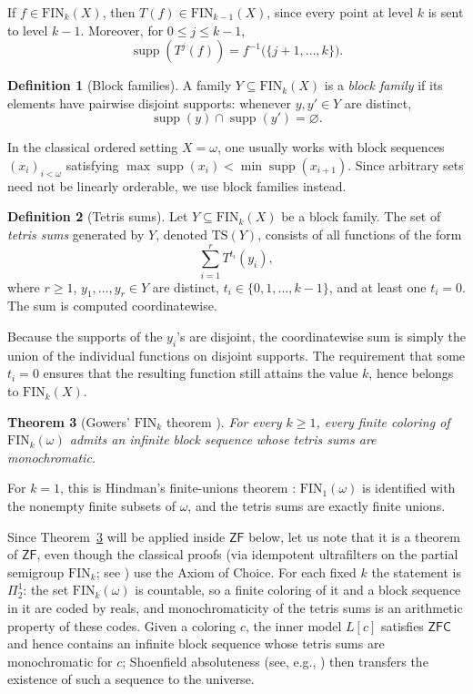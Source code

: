 \documentclass[11pt]{amsart}
\newtheorem{theorem}{Theorem}[section]
\theoremstyle{definition}
\newtheorem{definition}[theorem]{Definition}
\DeclareMathOperator{\supp}{supp}
\newcommand{\ZF}{\mathsf{ZF}}
\newcommand{\ZFC}{\mathsf{ZFC}}
\newcommand{\FIN}{\mathrm{FIN}}
\newcommand{\TS}{\mathrm{TS}}
\begin{document}
If \(f\in\FIN_k(X)\), then \(T(f)\in\FIN_{k-1}(X)\), since every point at level \(k\) is sent to level \(k-1\).  Moreover, for \(0\leq j\leq k-1\),
\[
    \supp(T^j(f))=f^{-1}\bigl(\{j+1,\dots,k\}\bigr).
\]

\begin{definition}[Block families]
A family \(Y\subseteq \FIN_k(X)\) is a \emph{block family} if its elements have pairwise disjoint supports: whenever \(y,y'\in Y\) are distinct,
\[
    \supp(y)\cap \supp(y')=\varnothing.
\]
\end{definition}

In the classical ordered setting \(X=\omega\), one usually works with block sequences \((x_i)_{i<\omega}\) satisfying \(\max\supp(x_i)<\min\supp(x_{i+1})\).  Since arbitrary sets need not be linearly orderable, we use block families instead.

\begin{definition}[Tetris sums]
Let \(Y\subseteq \FIN_k(X)\) be a block family.  The set of \emph{tetris sums} generated by \(Y\), denoted \(\TS(Y)\), consists of all functions of the form
\[
    \sum_{i=1}^r T^{t_i}(y_i),
\]
where \(r\geq 1\), \(y_1,
\dots,y_r\in Y\) are distinct, \(t_i\in\{0,1,\dots,k-1\}\), and at least one \(t_i=0\).  The sum is computed coordinatewise.
\end{definition}

Because the supports of the \(y_i\)'s are disjoint, the coordinatewise sum is simply the union of the individual functions on disjoint supports.  The requirement that some \(t_i=0\) ensures that the resulting function still attains the value \(k\), hence belongs to \(\FIN_k(X)\).

\begin{theorem}[Gowers' \(\FIN_k\) theorem \cite{Gowers}]\label{thm:gowers}
For every \(k\geq 1\), every finite coloring of \(\FIN_k(\omega)\) admits an infinite block sequence whose tetris sums are monochromatic.
\end{theorem}

For \(k=1\), this is Hindman's finite-unions theorem \cite{Hindman}: \(\FIN_1(\omega)\) is identified with the nonempty finite subsets of \(\omega\), and the tetris sums are exactly finite unions.

Since Theorem~\ref{thm:gowers} will be applied inside \(\ZF\) below, let us note that it is a theorem of \(\ZF\), even though the classical proofs (via idempotent ultrafilters on the partial semigroup \(\FIN_k\); see \cite{Todorcevic}) use the Axiom of Choice.  For each fixed \(k\) the statement is \(\Pi^1_2\): the set \(\FIN_k(\omega)\) is countable, so a finite coloring of it and a block sequence in it are coded by reals, and monochromaticity of the tetris sums is an arithmetic property of these codes.  Given a coloring \(c\), the inner model \(L[c]\) satisfies \(\ZFC\) and hence contains an infinite block sequence whose tetris sums are monochromatic for \(c\); Shoenfield absoluteness (see, e.g., \cite[Chapter~25]{JechST}) then transfers the existence of such a sequence to the universe.
\end{document}
